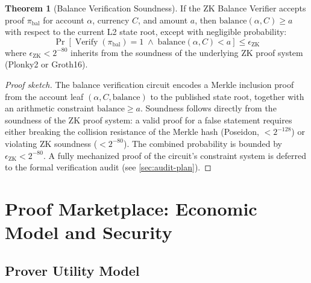 \documentclass[12pt,a4paper]{article}
\theoremstyle{definition}
\newtheorem{theorem}{Theorem}[section]
\theoremstyle{remark}
\DeclareMathOperator{\Verify}{Verify}
\begin{document}
\begin{theorem}[Balance Verification Soundness]
\label{thm:balance-soundness}
If the ZK Balance Verifier accepts proof $\pi_{\text{bal}}$ for account $\alpha$, currency $C$, and amount $a$, then $\text{balance}(\alpha, C) \geq a$ with respect to the current L2 state root, except with negligible probability:
\begin{equation}
\Pr[\Verify(\pi_{\text{bal}}) = 1 \;\wedge\; \text{balance}(\alpha, C) < a] \leq \epsilon_{\text{ZK}}
\end{equation}
where $\epsilon_{\text{ZK}} < 2^{-80}$ inherits from the soundness of the underlying ZK proof system (Plonky2 or Groth16).
\end{theorem}

\begin{proof}[Proof sketch]
The balance verification circuit encodes a Merkle inclusion proof from the account leaf $(\alpha, C, \text{balance})$ to the published state root, together with an arithmetic constraint $\text{balance} \geq a$. Soundness follows directly from the soundness of the ZK proof system: a valid proof for a false statement requires either breaking the collision resistance of the Merkle hash (Poseidon, $< 2^{-128}$) or violating ZK soundness ($< 2^{-80}$). The combined probability is bounded by $\epsilon_{\text{ZK}} < 2^{-80}$. A fully mechanized proof of the circuit's constraint system is deferred to the formal verification audit (see \cref{sec:audit-plan}).
\end{proof}


\section{Proof Marketplace: Economic Model and Security}
\label{sec:proof-marketplace-formal}

\subsection{Prover Utility Model}
\end{document}
